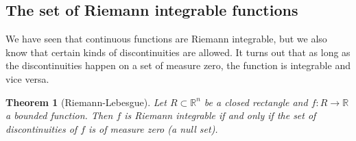 \documentclass[12pt]{book}
\newcommand{\R}{{\mathbb{R}}}
\theoremstyle{plain}
\newtheorem{thm}{Theorem}[section]
\theoremstyle{remark}
\theoremstyle{definition}
\theoremstyle{exercise}
\theoremstyle{example}
\begin{document}
\subsection{The set of Riemann integrable functions}

We have seen that continuous functions are Riemann integrable, but we also
know that certain kinds of discontinuities are allowed.
It turns out that as long as the discontinuities happen on a set of measure
zero, the function is integrable and vice versa.

\begin{thm}[Riemann-Lebesgue]
Let $R \subset \R^n$ be a closed rectangle and $f \colon R \to \R$
a bounded function.  Then $f$ is Riemann integrable if and only if
the set of discontinuities of $f$ is of measure zero (a null set).
\end{thm}
\end{document}
